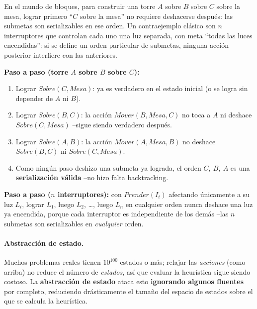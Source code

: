 \begin{example}
En el mundo de bloques, para construir una torre $A$ sobre $B$ sobre $C$ sobre la mesa, lograr
primero ``$C$ sobre la mesa'' no requiere deshacerse después: las submetas son serializables en ese
orden. Un contraejemplo clásico son $n$ interruptores que controlan cada uno una luz separada, con
meta ``todas las luces encendidas'': si se define un orden particular de submetas, ninguna acción
posterior interfiere con las anteriores.

\textbf{Paso a paso (torre $A$ sobre $B$ sobre $C$):}
\begin{enumerate}
    \item Lograr $Sobre(C,Mesa)$: ya es verdadero en el estado inicial (o se logra sin depender de
    $A$ ni $B$).
    \item Lograr $Sobre(B,C)$: la acción $Mover(B,Mesa,C)$ no toca a $A$ ni deshace
    $Sobre(C,Mesa)$ --sigue siendo verdadero después.
    \item Lograr $Sobre(A,B)$: la acción $Mover(A,Mesa,B)$ no deshace $Sobre(B,C)$ ni
    $Sobre(C,Mesa)$.
    \item Como ningún paso deshizo una submeta ya lograda, el orden $C,\ B,\ A$ es una
    \textbf{serialización válida} --no hizo falta backtracking.
\end{enumerate}
\textbf{Paso a paso ($n$ interruptores):} con $Prender(I_i)$ afectando únicamente a su luz $L_i$,
lograr $L_1$, luego $L_2$, \ldots, luego $L_n$ en cualquier orden nunca deshace una luz ya encendida,
porque cada interruptor es independiente de los demás --las $n$ submetas son serializables en
\emph{cualquier} orden.
\end{example}

\paragraph{Abstracción de estado.} Muchos problemas reales tienen $10^{100}$ estados o más; relajar
las \emph{acciones} (como arriba) no reduce el número de \emph{estados}, así que evaluar la
heurística sigue siendo costoso. La \textbf{abstracción de estado} ataca esto \textbf{ignorando
algunos fluentes} por completo, reduciendo drásticamente el tamaño del espacio de estados sobre el
que se calcula la heurística.

